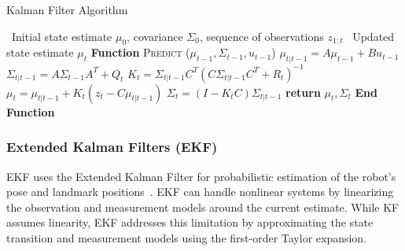 \begin{algorithm}
    \caption{Kalman Filter Algorithm}\label{alg:kalman_filter}
    \begin{algorithmic}[1]
    \REQUIRE~Initial state estimate $\mu_0$, covariance $\Sigma_0$, sequence of observations $z_{1:t}$
    \ENSURE~Updated state estimate $\mu_{t}$
    \STATE\textbf{Function} \textsc{Predict} ($\mu_{t-1}, \Sigma_{t-1}, u_{t-1}$)
    \STATE\quad $\mu_{t|t-1} = A \mu_{t-1} + B u_{t-1}$
    \STATE\quad $\Sigma_{t|t-1} = A \Sigma_{t-1} A^T + Q_t$
    \STATE\quad $K_t = \Sigma_{t|t-1} C^T {\left(C \Sigma_{t|t-1} C^T + R_t\right)}^{-1}$
    \STATE\quad $\mu_{t} = \mu_{t|t-1} + K_t (z_t - C \mu_{t|t-1})$
    \STATE\quad $\Sigma_{t} = (I - K_t C) \Sigma_{t|t-1}$
    \STATE\quad \textbf{return} $\mu_{t}, \Sigma_{t}$
    \STATE\textbf{End Function}
    \end{algorithmic}
\end{algorithm}
    






\newpage
\subsubsection{Extended Kalman Filters (EKF)}
EKF uses the Extended Kalman Filter for probabilistic estimation of the robot's pose and landmark
positions~\cite{thrun2005probabilistic}. EKF can handle nonlinear systems by linearizing the observation and measurement models around the current estimate.
While KF assumes linearity, EKF addresses this limitation by approximating
the state transition and measurement models using the first-order Taylor expansion.

